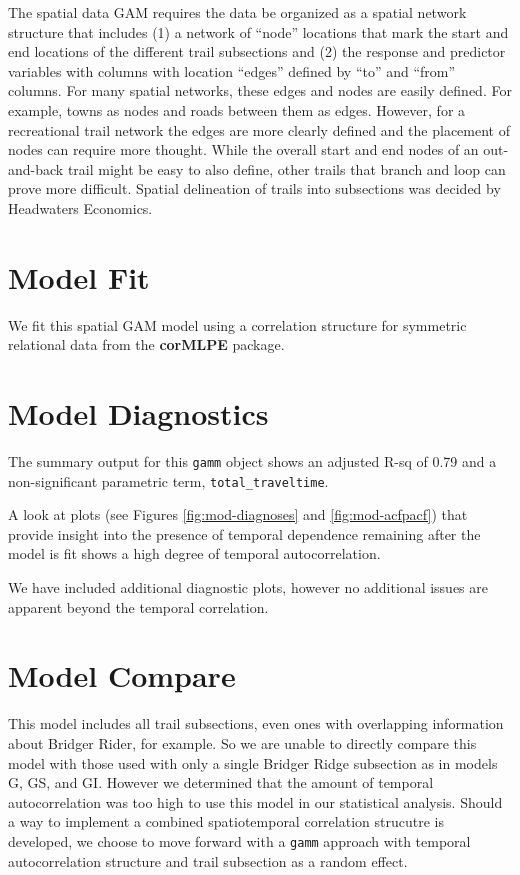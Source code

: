 \documentclass[
]{book}
\begin{document}
The spatial data GAM requires the data be organized as a spatial network structure that includes (1) a network of ``node'' locations that mark the start and end locations of the different trail subsections and (2) the response and predictor variables with columns with location ``edges'' defined by ``to'' and ``from'' columns. For many spatial networks, these edges and nodes are easily defined. For example, towns as nodes and roads between them as edges. However, for a recreational trail network the edges are more clearly defined and the placement of nodes can require more thought. While the overall start and end nodes of an out-and-back trail might be easy to also define, other trails that branch and loop can prove more difficult. Spatial delineation of trails into subsections was decided by Headwaters Economics.

\hypertarget{model-fit}{%
\section{Model Fit}\label{model-fit}}

We fit this spatial GAM model using a correlation structure for symmetric relational data from the \textbf{corMLPE} package.

\hypertarget{model-diagnostics}{%
\section{Model Diagnostics}\label{model-diagnostics}}

The summary output for this \texttt{gamm} object shows an adjusted R-sq of 0.79 and a non-significant parametric term, \texttt{total\_traveltime}.

A look at plots (see Figures \ref{fig:mod-diagnoses} and \ref{fig:mod-acfpacf}) that provide insight into the presence of temporal dependence remaining after the model is fit shows a high degree of temporal autocorrelation.

We have included additional diagnostic plots, however no additional issues are apparent beyond the temporal correlation.

\hypertarget{model-compare}{%
\section{Model Compare}\label{model-compare}}

This model includes all trail subsections, even ones with overlapping information about Bridger Rider, for example. So we are unable to directly compare this model with those used with only a single Bridger Ridge subsection as in models G, GS, and GI. However we determined that the amount of temporal autocorrelation was too high to use this model in our statistical analysis. Should a way to implement a combined spatiotemporal correlation strucutre is developed, we choose to move forward with a \texttt{gamm} approach with temporal autocorrelation structure and trail subsection as a random effect.

  
\end{document}
